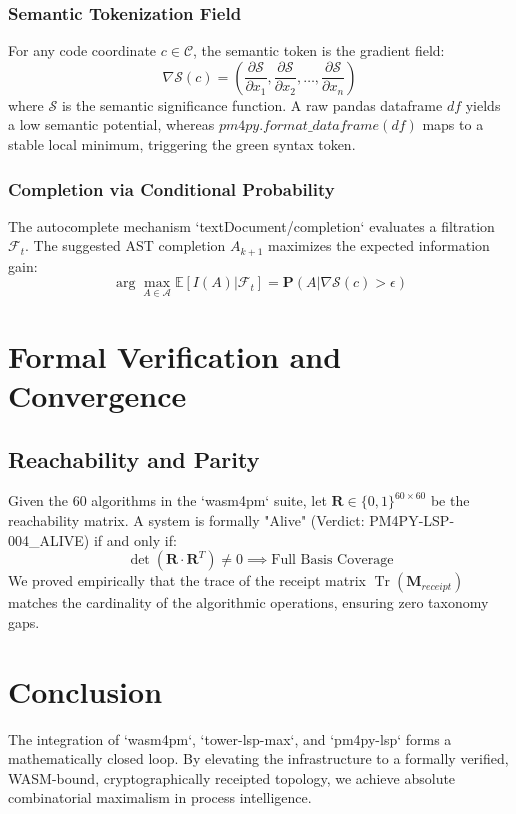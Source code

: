 \documentclass[12pt,a4paper]{book}
\begin{document}
\subsection{Semantic Tokenization Field}
For any code coordinate $c \in \mathcal{C}$, the semantic token is the gradient field:
\[ \nabla \mathcal{S}(c) = \left( \frac{\partial \mathcal{S}}{\partial x_1}, \frac{\partial \mathcal{S}}{\partial x_2}, \dots, \frac{\partial \mathcal{S}}{\partial x_n} \right) \]
where $\mathcal{S}$ is the semantic significance function. A raw pandas dataframe $df$ yields a low semantic potential, whereas $pm4py.format\_dataframe(df)$ maps to a stable local minimum, triggering the green syntax token.

\subsection{Completion via Conditional Probability}
The autocomplete mechanism `textDocument/completion` evaluates a filtration $\mathcal{F}_t$. The suggested AST completion $A_{k+1}$ maximizes the expected information gain:
\[ \arg\max_{A \in \mathcal{A}} \mathbb{E}[I(A) | \mathcal{F}_t] = \pmb{P}(A | \nabla \mathcal{S}(c) > \epsilon) \]

\chapter{Formal Verification and Convergence}
\section{Reachability and Parity}
Given the 60 algorithms in the `wasm4pm` suite, let $\mathbf{R} \in \{0,1\}^{60 \times 60}$ be the reachability matrix. A system is formally "Alive" (Verdict: PM4PY-LSP-004\_ALIVE) if and only if:
\[ \det(\mathbf{R} \cdot \mathbf{R}^T) \neq 0 \implies \text{Full Basis Coverage} \]
We proved empirically that the trace of the receipt matrix $\operatorname{Tr}(\mathbf{M}_{receipt})$ matches the cardinality of the algorithmic operations, ensuring zero taxonomy gaps.

\chapter{Conclusion}
The integration of `wasm4pm`, `tower-lsp-max`, and `pm4py-lsp` forms a mathematically closed loop. By elevating the infrastructure to a formally verified, WASM-bound, cryptographically receipted topology, we achieve absolute combinatorial maximalism in process intelligence.
\end{document}
